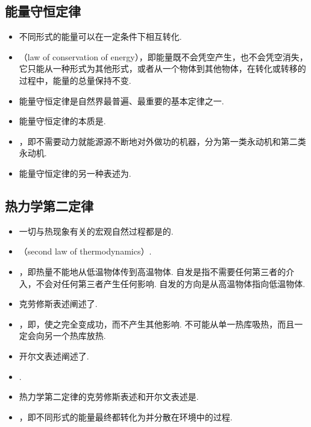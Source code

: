\subsection{能量守恒定律}
\vspace{10pt}
\begin{itemize}
\item 不同形式的能量可以在一定条件下相互转化.
\item {}（law of conservation of energy），即能量既不会凭空产生，也不会凭空消失，它只能从一种形式为其他形式，或者从一个物体到其他物体，在转化或转移的过程中，能量的总量保持不变.
\item 能量守恒定律是自然界最普遍、最重要的基本定律之一.
\item 能量守恒定律的本质是.
\item {}，即不需要动力就能源源不断地对外做功的机器，分为第一类永动机和第二类永动机.
\item 能量守恒定律的另一种表述为.
\end{itemize}

\subsection{热力学第二定律}
\vspace{10pt}
\begin{itemize}
\item 一切与热现象有关的宏观自然过程都是的.
\item {}（second law of thermodynamics）.
\item {}，即热量不能地从低温物体传到高温物体. 自发是指不需要任何第三者的介入，不会对任何第三者产生任何影响. 自发的方向是从高温物体指向低温物体.
\item 克劳修斯表述阐述了.
\item {}，即，使之完全变成功，而不产生其他影响. 不可能从单一热库吸热，而且一定会向另一个热库放热.
\item 开尔文表述阐述了.
\item {}.
\item 热力学第二定律的克劳修斯表述和开尔文表述是.
\item {}，即不同形式的能量最终都转化为并分散在环境中的过程.
\end{itemize}
